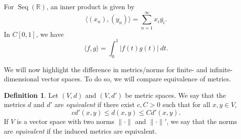 \documentclass[a4paper, openany]{memoir}
\theoremstyle{definition}
\newtheorem{definition}{Definition}[section]
\theoremstyle{plain}
\begin{document}

            
            

    For $\operatorname{Seq}(\mathbb{R})$, an inner product is given by
    \[\langle (x_n), (y_n) \rangle = \sum_{n=1}^\infty x_i \overline{y_i}.\]
    In $C[0, 1]$, we have
    \[\langle f, g \rangle = \int_0^1 |f(t) g(t)| \ dt.\]

    We will now highlight the difference in metrics/norms for finite- and infinite-dimensional vector spaces. To do so, we will compare equivalence of metrics.
    \begin{definition}
        Let $(V, d)$ and $(V, d')$ be metric spaces. We say that the metrics $d$ and $d'$ are \emph{equivalent} if there exist $c, C > 0$ such that for all $x, y \in V$,
        \[cd'(x, y) \leq d(x, y) \leq Cd'(x, y).\]
        If $V$ is a vector space with two norms $\lVert \cdot \rVert$ and $\lVert \cdot \rVert'$, we say that the norms are \emph{equivalent} if the induced metrics are equivalent.
    \end{definition}
    
\end{document}
